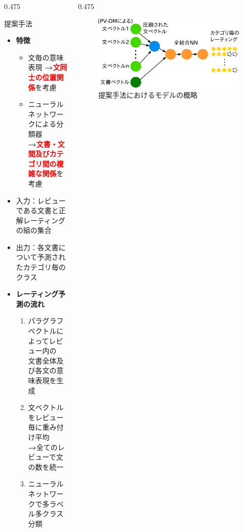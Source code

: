 \documentclass[unicode,10pt]{beamer}
\newcommand{\arrow}{\textcolor{ttiblue}{\textbf{→}}\hspace{1ex}}
\newcommand{\itemtitle}[1]{\textbf{#1}\\}
\newcommand{\fire}[1]{\textcolor{red}{\textbf{#1}}}
\newcommand{\columnsize}{0.475\textwidth}
\begin{document}
\begin{frame}
\begin{columns}[onlytextwidth,t]
\begin{column}{\columnsize}
  \begin{block}{提案手法}
    \begin{itemize}
      \item \itemtitle{特徴}
        \begin{itemize}
          \item 文毎の意味表現 \arrow \fire{文同士の位置関係}を考慮
          \item ニューラルネットワークによる分類器 \\
                \arrow \fire{文書・文間及びカテゴリ間の複雑な関係}を考慮
        \end{itemize}
      \item 入力：レビューである文書と正解レーティングの組の集合
      \item 出力：各文書について予測されたカテゴリ毎のクラス
      \item \itemtitle{レーティング予測の流れ}
        \begin{enumerate}
          \item パラグラフベクトルによってレビュー内の \\
                文書全体及び各文の意味表現を生成
          \item 文ベクトルをレビュー毎に重み付け平均 \\
                \arrow 全てのレビューで文の数を統一
          \item ニューラルネットワークで多ラベル多クラス分類
        \end{enumerate}
    \end{itemize}
  \end{block}
\end{column}

\begin{column}{\columnsize}
  \begin{figure}
    \includegraphics[width=\linewidth]{fig/model.png}
    \caption{提案手法におけるモデルの概略}
  \end{figure}


\end{column}
\end{columns}
\end{frame}
\end{document}
